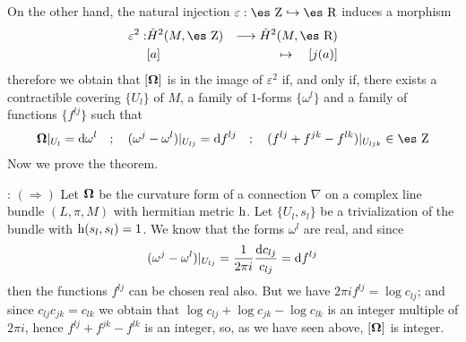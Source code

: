 \documentclass[12pt]{article}
\def\beann{\begin{eqnarray*}}
\def\eeann{\end{eqnarray*}}
\def\d{{\rm d}}
\def\h{{\rm h}}
\def\curv{{\bf \Omega}}
\def\Zahl{\mbox{\es Z}}
\def\Real{\mbox{\es R}}
\begin{document}
On the other hand, the natural injection
$\varepsilon : \Zahl \hookrightarrow \Real$ induces a morphism
\beann
\varepsilon^2:& \check{H}^2(M,\Zahl )& \longrightarrow
\check{H}^2(M,\Real )
\\
& [a] & \mapsto \quad [j(a)]
\eeann
therefore we obtain that $[\curv ]$ is in the image of $\varepsilon^2$
if, and only if, there exists a contractible covering $\{ U_l \}$ of
$M$,
a family of $1$-forms $\{ \omega^l  \}$
and a family of functions $\{ f^{l j} \}$ such that
$$
\curv \vert_{U_l} = \d \omega^l
\quad ; \quad
(\omega^j - \omega^l )\vert_{U_{l j}} = \d f^{l j}
\quad ; \quad
(f^{l j} + f^{jk} - f^{l k})\vert_{U_{l jk}} \in \Zahl
$$
Now we prove the theorem.
\medskip

: 
$(\Longrightarrow )$    \quad
Let $\curv $ be the curvature form of a connection $\nabla$
on a complex line bundle $(L,\pi ,M)$ with hermitian metric $\h$.
Let $\{ U_l,s_l \}$ be a trivialization of the bundle with $\h
(s_l,s_l)=1$.
We know that the forms $\omega^l $ are real, and since
$$
(\omega^j - \omega^l )\vert_{U_{l j}} =
\frac{1}{2\pi i} \frac{\d c_{l j}}{c_{l j}} =
\d f^{l j}
$$
then the functions $f^{l j}$ can be chosen real also.
But we have $2\pi i f^{l j} = \log c_{l j}$;
and since $c_{l j} c_{jk} = c_{l k}$ we obtain that
$\log c_{l j} + \log c_{jk} - \log c_{l k}$
is an integer multiple of $2\pi i$, hence $f^{l j} + f^{jk} - f^{l k}$
is an integer, so, as we have seen above, $[\curv ]$ is integer.
\end{document}
